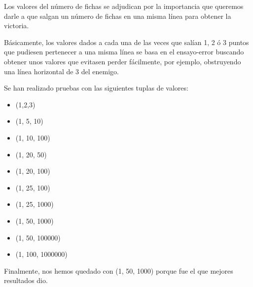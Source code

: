 \documentclass[a4paper, 11pt]{article}
\begin{document}
			Los valores del número de fichas se adjudican por la importancia que queremos darle
			a que salgan un número de fichas en una misma línea para obtener la victoria.
		
			Básicamente, los valores dados a cada una de las veces que salían 1, 2 ó 3 puntos
			que pudiesen pertenecer a una misma línea se basa en el ensayo-error buscando obtener
			unos valores que evitasen perder fácilmente, por ejemplo, obstruyendo una línea
			horizontal de 3 del enemigo.
			
			Se han realizado pruebas con las siguientes tuplas de valores:
			\begin{itemize}
				\item (1,2,3)
				\item (1, 5, 10)
				\item (1, 10, 100)
				\item (1, 20, 50)
				\item (1, 20, 100)
				\item (1, 25, 100)
				\item (1, 25, 1000)
				\item (1, 50, 1000)
				\item (1, 50, 100000)
				\item (1, 100, 1000000)
			\end{itemize}
			
			Finalmente, nos hemos quedado con (1, 50, 1000) porque fue el que mejores resultados dio.
\end{document}
